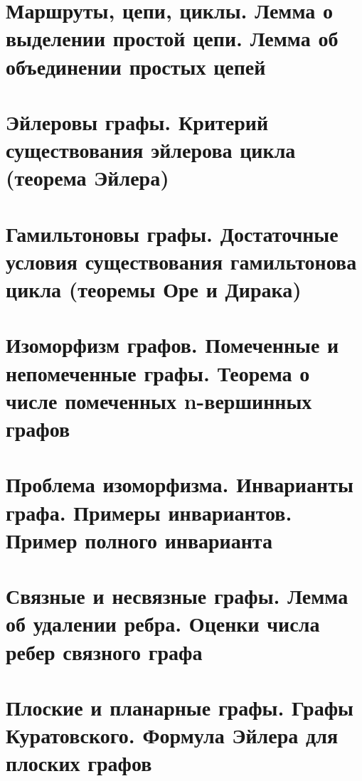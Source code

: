 \documentclass[a4paper]{article}
\theoremstyle{definition}
\theoremstyle{remark}
\begin{document}
    \section{Маршруты, цепи, циклы. Лемма о выделении простой цепи. Лемма об объединении 
    простых цепей}
    \section{Эйлеровы графы. Критерий существования эйлерова цикла (теорема Эйлера)}
    \section{Гамильтоновы графы. Достаточные условия существования гамильтонова цикла (теоремы 
    Оре и Дирака)}
    \section{Изоморфизм графов. Помеченные и непомеченные графы. Теорема о числе помеченных 
    n-вершинных графов}
    \section{Проблема изоморфизма. Инварианты графа. Примеры инвариантов. Пример полного 
    инварианта}
    \section{Связные и несвязные графы. Лемма об удалении ребра. Оценки числа ребер связного 
    графа}
    \section{Плоские и планарные графы. Графы Куратовского. Формула Эйлера для плоских графов}
\end{document}

